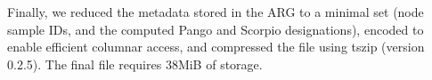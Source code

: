 \documentclass[12pt]{article}
\begin{document}
Finally, we reduced the metadata stored in the ARG to a minimal
set (node sample IDs, and the computed Pango and Scorpio
designations), encoded to enable efficient columnar access,
and compressed the file using tszip (version 0.2.5). The final
file requires 38MiB of storage.


\end{document}
